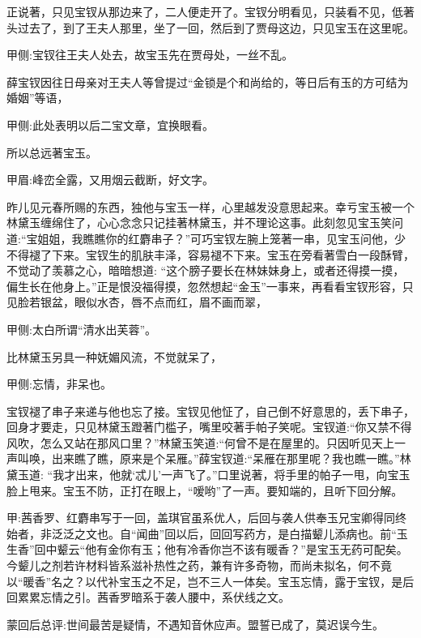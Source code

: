 \begin{parag}
    正说著，只见宝钗从那边来了，二人便走开了。宝钗分明看见，只装看不见，低著头过去了，到了王夫人那里，坐了一回，然后到了贾母这边，只见宝玉在这里呢。\begin{note}甲侧:宝钗往王夫人处去，故宝玉先在贾母处，一丝不乱。\end{note}薛宝钗因往日母亲对王夫人等曾提过“金锁是个和尚给的，等日后有玉的方可结为婚姻”等语，\begin{note}甲侧:此处表明以后二宝文章，宜换眼看。\end{note}所以总远著宝玉。\begin{note}甲眉:峰峦全露，又用烟云截断，好文字。\end{note}昨儿见元春所赐的东西，独他与宝玉一样，心里越发没意思起来。幸亏宝玉被一个林黛玉缠绵住了，心心念念只记挂著林黛玉，并不理论这事。此刻忽见宝玉笑问道:“宝姐姐，我瞧瞧你的红麝串子？”可巧宝钗左腕上笼著一串，见宝玉问他，少不得褪了下来。宝钗生的肌肤丰泽，容易褪不下来。宝玉在旁看著雪白一段酥臂，不觉动了羡慕之心，暗暗想道: “这个膀子要长在林妹妹身上，或者还得摸一摸，偏生长在他身上。”正是恨没福得摸，忽然想起“金玉”一事来，再看看宝钗形容，只见脸若银盆，眼似水杏，唇不点而红，眉不画而翠，\begin{note}甲侧:太白所谓“清水出芙蓉”。\end{note}比林黛玉另具一种妩媚风流，不觉就呆了，\begin{note}甲侧:忘情，非呆也。\end{note}宝钗褪了串子来递与他也忘了接。宝钗见他怔了，自己倒不好意思的，丢下串子，回身才要走，只见林黛玉蹬著门槛子，嘴里咬著手帕子笑呢。宝钗道:“你又禁不得风吹，怎么又站在那风口里？”林黛玉笑道:“何曾不是在屋里的。只因听见天上一声叫唤，出来瞧了瞧，原来是个呆雁。”薛宝钗道:“呆雁在那里呢？我也瞧一瞧。”林黛玉道: “我才出来，他就‘忒儿’一声飞了。”口里说著，将手里的帕子一甩，向宝玉脸上甩来。宝玉不防，正打在眼上，“嗳哟”了一声。要知端的，且听下回分解。
\end{parag}


\begin{parag}
    \begin{note}甲:茜香罗、红麝串写于一回，盖琪官虽系优人，后回与袭人供奉玉兄宝卿得同终始者，非泛泛之文也。自“闻曲”回以后，回回写药方，是白描颦儿添病也。前“玉生香”回中颦云“他有金你有玉；他有冷香你岂不该有暖香？”是宝玉无药可配矣。今颦儿之剂若许材料皆系滋补热性之药，兼有许多奇物，而尚未拟名，何不竟以“暖香”名之？以代补宝玉之不足，岂不三人一体矣。宝玉忘情，露于宝钗，是后回累累忘情之引。茜香罗暗系于袭人腰中，系伏线之文。\end{note}
\end{parag}


\begin{parag}
    \begin{note}蒙回后总评:世间最苦是疑情，不遇知音休应声。盟誓已成了，莫迟误今生。\end{note}
\end{parag}
